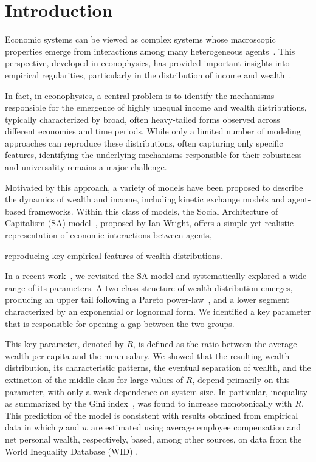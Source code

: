 \documentclass[12pt,preprint]{revtex4-1}
\newcommand{\R}{\color{red}}
\begin{document}


\maketitle


\section{Introduction} 
\label{sec:introduction}


{\color{red}
  Economic systems can be viewed as complex systems whose macroscopic properties emerge from interactions among many heterogeneous agents~\cite{JUSUP20221,yakovenko2009,Farmer2009}. This perspective, developed in econophysics, has provided important insights into empirical regularities, particularly in the distribution of income and wealth~\cite{shaikh}. 

In fact, in econophysics, a central problem is to identify the mechanisms responsible for the emergence of highly unequal income and wealth distributions, typically characterized by broad, often heavy-tailed forms observed across different economies and time periods. 
 While only a limited number of modeling approaches can reproduce these distributions, often capturing only specific features, identifying the underlying mechanisms responsible for their robustness and universality remains a major challenge. 

  Motivated by this approach, a variety of models have been proposed to describe the dynamics of wealth and income, including kinetic exchange models and agent-based frameworks. 
Within this class of models, the Social Architecture of Capitalism (SA) model~\cite{WRIGHT2005589}, proposed by Ian Wright, offers a simple yet realistic representation of economic interactions between agents,} {\R reproducing key empirical features of wealth distributions.  

 In a recent work~\cite{Borba2025}, we revisited the SA model and systematically explored a wide range of its parameters. A two-class structure of wealth distribution emerges, producing an upper tail following a Pareto power-law~\cite{dragulescu2001,yakovenko2023}, and a lower segment characterized by an exponential or lognormal form. We identified a key parameter that is responsible for opening a gap between the two groups.
}
 
This key parameter, denoted by $R$, is defined as the ratio between the average wealth per capita and the mean salary. 
We showed that the resulting wealth distribution, its characteristic patterns, the eventual separation of wealth, and the extinction of the middle class for large values of $R$, depend primarily on this parameter, with only a weak dependence on system size. 
In particular, inequality as summarized by the Gini index~\cite{PLATAPEREZ201579}, was found to increase  monotonically with $R$.  
This prediction of the model is consistent with results obtained from  empirical data in which $\overline{p}$ and  $\overline{w}$ are estimated using  average employee compensation and  net personal wealth, respectively, based, among other sources, on data from  the World Inequality Database (WID) \cite{WID}.
 
\end{document}
